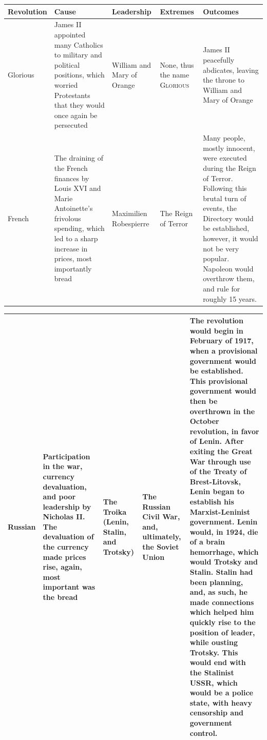 \documentclass[12pt]{article}
\begin{document}
\begin{enumerate}
\begin{tabular}{|p{}|p{}|p{}|p{}|p{}|}
\hline
Revolution & Cause & Leadership & Extremes & Outcomes \\
\hline
Glorious & James II appointed many Catholics to military and political positions, which worried Protestants that they would once again be persecuted & William and Mary of Orange  & None, thus the name \textsc{Glorious} & James II peacefully abdicates, leaving the throne to William and Mary of Orange  \\
\hline
French & The draining of the French finances by Louis XVI and Marie Antoinette's frivolous spending, which led to a sharp increase in prices, most importantly bread & Maximilien Robespierre  & The Reign of Terror  & Many people, mostly innocent, were executed during the Reign of Terror. Following this brutal turn of events, the Directory would be established, however, it would not be very popular. Napoleon would overthrow them, and rule for roughly 15 years.  \\
\hline
\end{tabular}
\newpage
\hspace{-25pt} \begin{tabular}{|p{}|p{}|p{}|p{}|p{}|}
\hline
Russian & Participation in the war, currency devaluation, and poor leadership by Nicholas II. The devaluation of the currency made prices rise, again, most important was the bread & The Troika (Lenin, Stalin, and Trotsky) & The Russian Civil War, and, ultimately, the Soviet Union & The revolution would begin in February of 1917, when a provisional government would be established. This provisional government would then be overthrown in the October revolution, in favor of Lenin. After exiting the Great War through use of the Treaty of Brest-Litovsk, Lenin began to establish his Marxist-Leninist government. Lenin would, in 1924, die of a brain hemorrhage, which would Trotsky and Stalin. Stalin had been planning, and, as such, he made connections which helped him quickly rise to the position of leader, while ousting Trotsky. This would end with the Stalinist USSR, which would be a police state, with heavy censorship and government control.  \\
\hline
\end{tabular}

\hspace{-25pt} \begin{tabular}{|p{}|p{}|p{}|p{}|} 


\end{tabular}
\end{enumerate}
\end{document}
